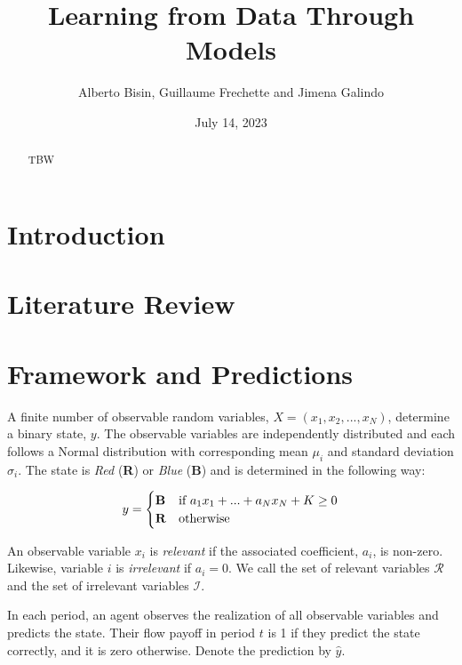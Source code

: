 \documentclass[
  12pt,
]{article}
\title{Learning from Data Through Models}
\author{Alberto Bisin, Guillaume Frechette and Jimena Galindo}
\date{July 14, 2023}
\begin{document}
\maketitle
\begin{abstract}
TBW
\end{abstract}

\hypertarget{introduction}{%
\section{Introduction}\label{introduction}}

\hypertarget{literature-review}{%
\section{Literature Review}\label{literature-review}}

\hypertarget{framework-and-predictions}{%
\section{Framework and Predictions}\label{framework-and-predictions}}

A finite number of observable random variables,
\(X =(x_1, x_2, ..., x_N)\), determine a binary state, \(y\). The
observable variables are independently distributed and each follows a
Normal distribution with corresponding mean \(\mu_i\) and standard
deviation \(\sigma_i\). The state is \emph{Red} (\textbf{R}) or
\emph{Blue} (\textbf{B}) and is determined in the following way:

\begin{equation*}
y = \begin{cases}
\text{\textbf{B}} &\text{if $a_1x_1+...+a_Nx_N + K\geq0$}\\
\text{\textbf{R}} &\text{otherwise}
\end{cases}
\end{equation*}

An observable variable \(x_i\) is \emph{relevant} if the associated
coefficient, \(a_i\), is non-zero. Likewise, variable \(i\) is
\emph{irrelevant} if \(a_i = 0\). We call the set of relevant variables
\(\mathcal{R}\) and the set of irrelevant variables \(\mathcal{I}\).

In each period, an agent observes the realization of all observable
variables and predicts the state. Their flow payoff in period \(t\) is 1
if they predict the state correctly, and it is zero otherwise. Denote
the prediction by \(\hat{y}\).
\end{document}
